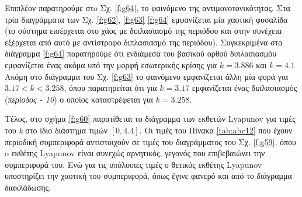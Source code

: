 Επιπλέον παρατηρούμε στo Σχ. \ref{f:g64}, το φαινόμενο της αντιμονοτονικότητας. Στα τρία διαγράμματα των Σχ. \ref{f:g62}, \ref{f:g63} \ref{f:g64} εμφανίζεται μία χαοτική φυσαλίδα (το σύστημα εισέρχεται στο χάος με διπλασιασμό της περιόδου και στην συνέχεια εξέρχεται από αυτό με αντίστροφο διπλασιασμό της περιόδου). Συγκεκριμένα στο διάγραμμα \ref{f:g64} παρατηρούμε ότι ενδιάμεσα του βασικού ορθού διπλασιασμόυ εμφανίζεται ένας ακόμα υπό την μορφή εσωτερικής κρίσης για $k=3.886$ και $k=4.1$ Ακόμη στο διάγραμμα του Σχ. \ref{f:g63} το φαινόμενο εμφανίζεται άλλη μία φορά για $3.17<k<3.258$, όπου παρατηρείται ότι για $k=3.17$ εμφανίζεται ένας διπλασιασμός (\emph{περίοδος - 10}) ο οποίος καταστρέφεται για $k=3.258$.

Τέλος, στο σχήμα \ref{f:g60} παρατίθεται το διάγραμμα των εκθετών Lyapunov για τιμές του \emph{k} στο ίδιο διάστημα τιμών $[0, 4.4]$. Οι τιμές του Πίνακα \ref{tab:abc12} που έχουν περιοδική συμπεριφορά αντιστοιχούν σε τιμές του διαγράμματος του Σχ. \ref{f:g59}, όπου o εκθέτης Lyapunov είναι συνεχώς αρνητικός, γεγονός που επιβεβαιώνει την συμπεριφορά του. Ενώ για τις υπόλοιπες τιμές ο θετικός εκθέτης Lyapunov υποστηρίζει την χαοτική του συμπεριφορά, όπως έγινε φανερό και από το διάγραμμα διακλάδωσης.\\\\

